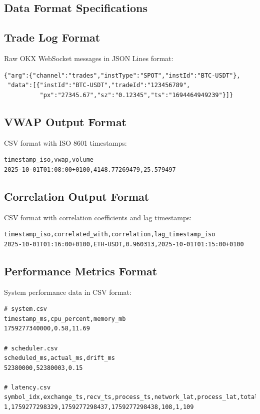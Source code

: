 \documentclass[12pt,a4paper]{article}
\begin{document}
\begin{appendices}
\section{Data Format Specifications}

\subsection{Trade Log Format}
Raw OKX WebSocket messages in JSON Lines format:
\begin{verbatim}
{"arg":{"channel":"trades","instType":"SPOT","instId":"BTC-USDT"},
 "data":[{"instId":"BTC-USDT","tradeId":"123456789",
          "px":"27345.67","sz":"0.12345","ts":"1694464949239"}]}
\end{verbatim}

\subsection{VWAP Output Format}
CSV format with ISO 8601 timestamps:
\begin{verbatim}
timestamp_iso,vwap,volume
2025-10-01T01:08:00+0100,4148.77269479,25.579497
\end{verbatim}

\subsection{Correlation Output Format}
CSV format with correlation coefficients and lag timestamps:
\begin{verbatim}
timestamp_iso,correlated_with,correlation,lag_timestamp_iso
2025-10-01T01:16:00+0100,ETH-USDT,0.960313,2025-10-01T01:15:00+0100
\end{verbatim}

\subsection{Performance Metrics Format}
System performance data in CSV format:
\begin{verbatim}
# system.csv
timestamp_ms,cpu_percent,memory_mb
1759277340000,0.58,11.69

# scheduler.csv
scheduled_ms,actual_ms,drift_ms
52380000,52380003,0.15

# latency.csv
symbol_idx,exchange_ts,recv_ts,process_ts,network_lat,process_lat,total_lat
1,1759277298329,1759277298437,1759277298438,108,1,109
\end{verbatim}


\end{appendices}
\end{document}

